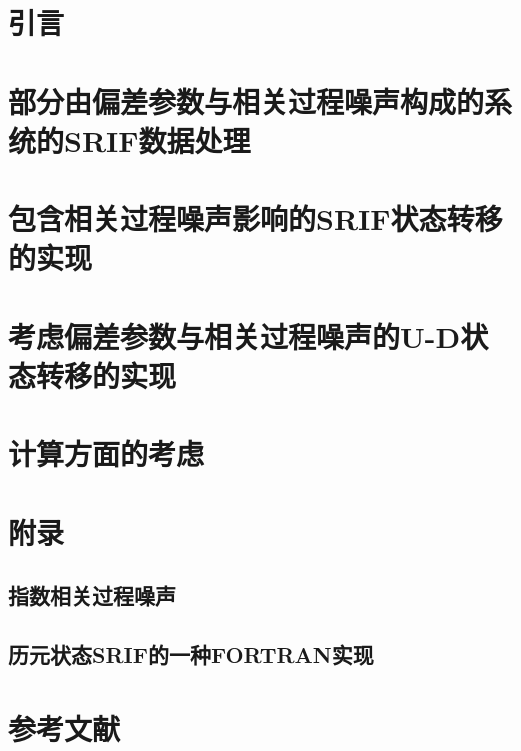 \documentclass[./book.tex]{subfiles}
\begin{document}
\section{引言}

\section{部分由偏差参数与相关过程噪声构成的系统的SRIF数据处理}

\section{包含相关过程噪声影响的SRIF状态转移的实现}

\section{考虑偏差参数与相关过程噪声的U-D状态转移的实现}

\section{计算方面的考虑}

\section{附录}

\subsection{指数相关过程噪声}

\subsection{历元状态SRIF的一种FORTRAN实现}

\section{参考文献}
\end{document}
